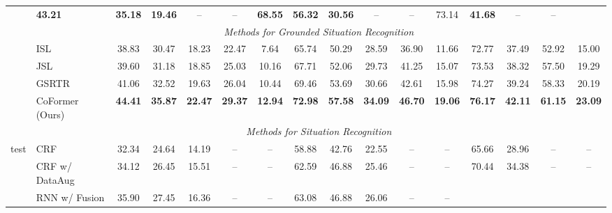 \begin{table*}[!t]
{\begin{tabular}{l|l|ccccc|ccccc|cccc}
            & \textbf{43.21} & \textbf{35.18} & \textbf{19.46} & -- & --
            & \textbf{68.55} & \textbf{56.32} & \textbf{30.56} & -- & --
            & 73.14 & \textbf{41.68} & -- & --
        \\
        \cline{2-16}
            & \multicolumn{15}{c}{\textit{Methods for Grounded Situation Recognition}}
        \\
        \cline{2-16}
            & ISL \cite{pratt2020grounded}
            & 38.83 & 30.47 & 18.23 & 22.47 & 7.64
            & 65.74 & 50.29 & 28.59 & 36.90 & 11.66
            & 72.77 & 37.49 & 52.92 & 15.00 
        \\
            & JSL \cite{pratt2020grounded}
            & 39.60 & 31.18 & 18.85 & 25.03 & 10.16
            & 67.71 & 52.06 & 29.73 & 41.25 & 15.07
            & 73.53 & 38.32 & 57.50 & 19.29
        \\
            & GSRTR \cite{cho2021gsrtr}
            & 41.06 & 32.52 & 19.63 & 26.04 & 10.44
            & 69.46 & 53.69 & 30.66 & 42.61 & 15.98
            & 74.27 & 39.24 & 58.33 & 20.19
        \\
            & \cellcolor[gray]{0.9}\mbox{CoFormer} (Ours)
            & \cellcolor[gray]{0.9}\textbf{44.41} & \cellcolor[gray]{0.9}\textbf{35.87} & \cellcolor[gray]{0.9}\textbf{22.47} & \cellcolor[gray]{0.9}\textbf{29.37} & \cellcolor[gray]{0.9}\textbf{12.94}
            & \cellcolor[gray]{0.9}\textbf{72.98} & \cellcolor[gray]{0.9}\textbf{57.58} & \cellcolor[gray]{0.9}\textbf{34.09} & \cellcolor[gray]{0.9}\textbf{46.70} & \cellcolor[gray]{0.9}\textbf{19.06} 
            & \cellcolor[gray]{0.9}\textbf{76.17} & \cellcolor[gray]{0.9}\textbf{42.11} & \cellcolor[gray]{0.9}\textbf{61.15} & \cellcolor[gray]{0.9}\textbf{23.09} 
        \\
        \hline
            & \multicolumn{15}{c}{\textit{Methods for Situation Recognition}}
        \\
        \cline{2-16}
        \multirow{9.5}{*}{test}
             & CRF \cite{yatskar2016situation}
             & 32.34 & 24.64 & 14.19 & -- & --
             & 58.88 & 42.76 & 22.55 & -- & --
             & 65.66 & 28.96 & -- & --
        \\
            & CRF w/ DataAug \cite{yatskar2017commonly}
            & 34.12 & 26.45 & 15.51 & -- & --
            & 62.59 & 46.88 & 25.46 & -- & --
            & 70.44 & 34.38 & -- & --
        \\
            & RNN w/ Fusion \cite{mallya2017recurrent}
            & 35.90 & 27.45 & 16.36 & -- & --
            & 63.08 & 46.88 & 26.06 & -- & --

\end{tabular}}
\end{table*}
